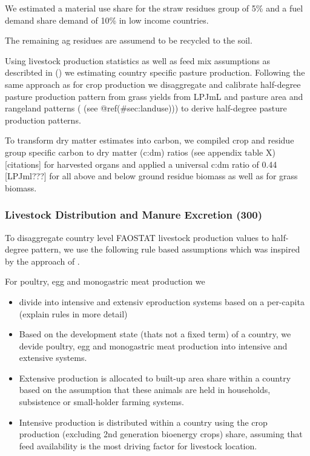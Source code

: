 \documentclass[gc, manuscript]{copernicus}
\begin{document}
We estimated a material use share for the straw residues group of 5\%
and a fuel demand share demand of 10\% in low income countries.

The remaining ag residues are assumend to be recycled to the soil.

Using livestock production statistics as well as feed mix assumptions as
describted in (\citep{weindl}) we estimating country specific pasture
production. Following the same approach as for crop production we
disaggregate and calibrate half-degree pasture production pattern from
grass yields from LPJmL and pasture area and rangeland patterns ( (see
@ref(\#sec:landuse))) to derive half-degree pasture production patterns.

To transform dry matter estimates into carbon, we compiled crop and
residue group specific carbon to dry matter (c:dm) ratios (see appendix
table X) {[}citations{]} for harvested organs and applied a universal
c:dm ratio of 0.44 {[}LPJml???{]} for all above and below ground residue
biomass as well as for grass biomass.

\subsubsection{Livestock Distribution and Manure Excretion (300)}

To disaggregate country level FAOSTAT livestock production values to
half-degree pattern, we use the following rule based assumptions which
was inspired by the approach of \citep{gilbert}.

For poultry, egg and monogastric meat production we

\begin{itemize}
\item
  divide into intensive and extensiv eproduction systems based on a
  per-capita (explain rules in more detail)
\item
  Based on the development state (thats not a fixed term) of a country,
  we devide poultry, egg and monogastric meat production into intensive
  and extensive systems.
\item
  Extensive production is allocated to built-up area share within a
  country based on the assumption that these animals are held in
  households, subsistence or small-holder farming systems.
\item
  Intensive production is distributed within a country using the crop
  production (excluding 2nd generation bioenergy crops) share, assuming
  that feed availability is the most driving factor for livestock
  location.
\end{itemize}
\end{document}
